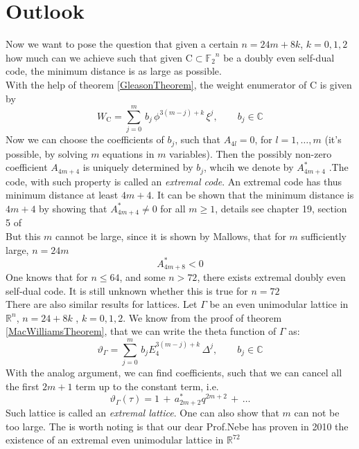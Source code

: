 \documentclass[12pt]{article}
\theoremstyle{definition}
\numberwithin{equation}{theorem}
\numberwithin{figure}{theorem}
\newcommand{\Ftwo}{\ensuremath{\mathbb{F}_2}}
\newcommand{\simpleCodes}{\ensuremath{\mathrm{C}}}
\newcommand{\thetaFunction}[1]{\ensuremath{\vartheta_{#1}}}
\newcommand{\Real}{\ensuremath{\mathbb{R}}}
\newcommand{\Complex}{\ensuremath{\mathbb{C}}}
\begin{document}
\section{Outlook}
Now we want to pose the question that given a certain $n = 24m + 8k$, $k = 0,1,2$ how much can we achieve such that given $\simpleCodes \subset \Ftwo^n$ be a doubly even self-dual code, the minimum distance is as large as possible.\\
With the help of theorem \ref{GleasonTheorem}, the weight enumerator of $\simpleCodes$ is given by
\[
	W_{\simpleCodes} = \sum_{j = 0}^{m}\,b_j\,\phi^{3(m-j)+k} \,\xi^j, \qquad b_j \in \Complex
\]
Now we can choose the coefficients of $b_j$, such that $A_{4l} = 0$, for $l = 1,\ldots,m$ (it's possible, by solving $m$ equations in $m$ variables). Then the possibly non-zero coefficient $A_{4m + 4}$ is uniquely determined by $b_j$, whcih we denote by $A_{4m+4}^{*}$ .The code, with such property is called an \emph{extremal code}. An extremal code has thus minimum distance at least $4m + 4$. It can be shown that the minimum distance is $4m + 4$ by showing that $A_{4m + 4}^* \neq 0$ for all $m \geq 1$, details see chapter 19, section 5 of \cite{macwilliams1977theory}\\
But this $m$ cannot be large, since it is shown by Mallows, that for $m$ sufficiently large, $n = 24m$
\[
	A_{4m + 8}^* < 0
\]
One knows that for $n \leq 64$, and some $n > 72$, there exists extremal doubly even self-dual code. It is still unknown whether this is true for $n = 72$\\
There are also similar results for lattices. Let $\Gamma$ be an even unimodular lattice in $\Real^n$, $n = 24 + 8k$ , $k = 0,1,2$. We know from the proof of theorem \ref{MacWilliamsTheorem}, that we can write the theta function of $\Gamma$ as:
\[
	\thetaFunction{\Gamma} = \sum_{j = 0}^m \, b_j E_4^{3(m - j) + k} \, \Delta^j,	\qquad b_j \in \Complex
\]
With the analog argument, we can find coefficients, such that we can cancel all the first $2m + 1$ term up to the constant term, i.e.
\[
	\thetaFunction{\Gamma}(\tau) = 1 \,+\, a_{2m + 2}^* q^{2m + 2}\, +\, \ldots
\]
Such lattice is called an \emph{extremal lattice}. One can also show that $m$ can not be too large. The is worth noting is that our dear Prof.Nebe has proven in 2010 the existence of an extremal even unimodular lattice in $\Real^{72}$

\newpage


\end{document}
